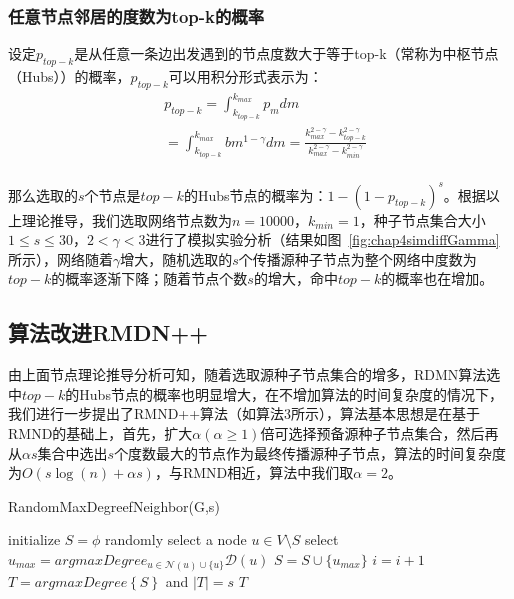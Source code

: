 \subsubsection{任意节点邻居的度数为top-k的概率}
设定$p_{top-k}$是从任意一条边出发遇到的节点度数大于等于top-k（常称为中枢节点（Hubs））的概率，$p_{top-k}$可以用积分形式表示为：
\begin{equation}
\label{equ:chap4:equ11}
	\begin{split}
	& p_{top-k}=\int_{k_{top-k}}^{k_{max}}p_mdm \\
	& =\int_{k_{top-k}}^{k_{max}}bm^{1-\gamma}dm=\frac{k_{max}^{2-\gamma}-k_{top-k}^{2-\gamma}}{k_{max}^{2-\gamma}-k_{min}^{2-\gamma}}\\
	\end{split}
\end{equation}

那么选取的$s$个节点是$top-k$的Hubs节点的概率为：$1-(1-p_{top-k})^{s}$。根据以上理论推导，我们选取网络节点数为$n=10000$，$k_{min}=1$，种子节点集合大小$1\le s \le 30$，$2<\gamma <3$进行了模拟实验分析（结果如图~\ref{fig:chap4simdiffGamma}所示），网络随着$\gamma$增大，随机选取的$s$个传播源种子节点为整个网络中度数为$top-k$的概率逐渐下降；随着节点个数$s$的增大，命中$top-k$的概率也在增加。
\subsection{算法改进RMDN++}
由上面节点理论推导分析可知，随着选取源种子节点集合的增多，RDMN算法选中$top-k$的Hubs节点的概率也明显增大，在不增加算法的时间复杂度的情况下，我们进行一步提出了RMND++算法（如算法3所示），算法基本思想是在基于RMND的基础上，首先，扩大$\alpha (\alpha \geq 1)$倍可选择预备源种子节点集合，然后再从$\alpha s$集合中选出$s$个度数最大的节点作为最终传播源种子节点，算法的时间复杂度为$O(s\log (n)+\alpha s)$，与RMND相近，算法中我们取$\alpha =2$。
\begin{algorithm}
	\caption{RandomMaxDegreefNeighbor(G,s)}
	\label{alg:chap4:RandomMaxDegreefNeighbor++}
	\begin{algorithmic}[1]
		\STATE initialize $S = \phi$
		\STATE randomly select a node $u \in V\setminus S$ 
		\STATE select $u_{max} = argmaxDegree_{u \in \mathcal{N}(u) \cup \{u\}} \mathcal{D}(u)$
		\STATE $S = S \cup \{u_{max}\}$
		\STATE $i = i + 1$
		\ENDWHILE
		\STATE $T=argmaxDegree\left\lbrace S \right\rbrace $ and $|T|=s$
		\RETURN $T$
	\end{algorithmic}
\end{algorithm}
